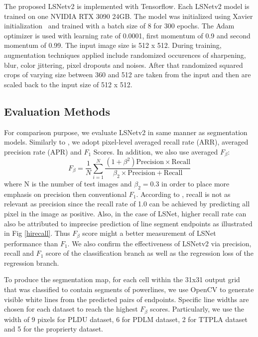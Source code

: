 \documentclass[journal]{IEEEtran}
\begin{document}
The proposed LSNetv2 is implemented with Tensorflow. Each LSNetv2 model is trained on one NVIDIA RTX 3090 24GB. The model was initialized using Xavier initialization~\cite{REF} and trained with a batch size of 8 for 300 epochs. The Adam optimizer is used with learning rate of 0.0001, first momentum of 0.9 and second momentum of 0.99. The input image size is 512 x 512. During training, augmentation techniques applied include randomized occurences of sharpening, blur, color jittering, pixel dropouts and noises. After that randomized squared crops of varying size between 360 and 512 are taken from the input and then are scaled back to the input size of 512 x 512.

\subsection{Evaluation Methods}

For comparison purpose, we evaluate LSNetv2 in same manner as segmentation models.
Similarly to \cite{Nguyen2020}, we adopt pixel-level averaged recall rate (ARR), averaged precision rate (APR) and $F_1$ Scores. In addition, we also use averaged $F_{\beta}$:
\begin{equation}
  F_{\beta} = \frac{1}{N} \sum_{i=1}^N  \frac{(1 + \beta^2)\text{Precision} \times \text{Recall}}{\beta_2 \times \text{Precision} + \text{Recall}} 
\end{equation}
where N is the number of test images and $\beta_2 = 0.3$ in order to place more emphasis on precision then conventional $F_1$. According to \cite{F03}, recall is not as relevant as precision since the recall rate of 1.0 can be achieved by predicting all pixel in the image as positive. Also, in the case of LSNet, higher recall rate can also be attributed to imprecise prediction of line segment endpoints as illustrated in Fig \ref{hirecall}. Thus $F_{\beta}$ score might a better measurement of LSNet performance than $F_1$. We also confirm the effectiveness of LSNetv2 via precision, recall and $F_1$ score of the classification branch as well as the regression loss of the regression branch.

To produce the segmentation map, for each cell within the 31x31 output grid that was classified to contain segments of powerlines, we use OpenCV to generate visible white lines from the predicted pairs of endpoints. Specific line widths are chosen for each dataset to reach the highest $F_{\beta}$ scores. Particularly, we use the width of 9 pixels for PLDU dataset, 6 for PDLM dataset, 2 for TTPLA dataset and 5 for the proprierty dataset.
\end{document}
